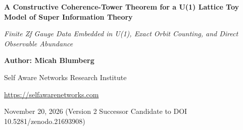 \documentclass[
  american,
  11pt,
  letterpaper,
]{article}
\author{}
\date{}
\begin{document}
\begin{center}

{\LARGE\bfseries A Constructive Coherence-Tower Theorem for a U(1) Lattice Toy Model of Super Information Theory\par}

\vspace{0.35em}

{\large\itshape Finite Zf Gauge Data Embedded in U(1), Exact Orbit Counting, and Direct Observable Abundance\par}

\vspace{0.8em}

{\small\textbf{Author: Micah Blumberg}\par}

{\small Self Aware Networks Research Institute\par}

{\small\url{https://selfawarenetworks.com}\par}

{\small November 20, 2026 (Version 2 Successor Candidate to DOI 10.5281/zenodo.21693908)\par}

\end{center}

\vspace{0.65em}

\begin{abstract}

Can a large hidden configuration space survive a gauge collapse and still yield more than linearly many distinguishable observable relations? This paper answers that consistency question in one exact finite construction. Edge variables take values in the finite subgroup \texttt{\ensuremath{\mu}\_f\ \ensuremath{\cong}\ Z\_f\ \ensuremath{\subset}\ U(1)} on a two-dimensional box; gauge-equivalent edge assignments collapse to the same plaquette curvatures; excitation-count windows select admissible curvatures; and a restricted plaquette readout supplies observable values. Lemma 1 classifies the gauge orbits exactly. Theorems 2-8 prove the seven interface properties called a coherence tower in the SIT formal program. Theorem 10 then gives an explicit box-and-alphabet schedule and a closed-form threshold after which the number of unordered translated, Hamming-distinguishable observable pairs exceeds \texttt{N\_j\^{}\{1+\ensuremath{\gamma}\}} for any prescribed \texttt{\ensuremath{\gamma}\ \textgreater{}\ 0}. Theorem 11 assembles these results into the finite Toy SIT Theorem relative to the BC-004 interface definition. The result is an exact existence and realizability theorem for that finite interface. Extending it to the covariant full-SIT model, a nontrivial decoherence relation, continuous phase resolution, or empirical physics remains separate work.

\end{abstract}
\end{document}
